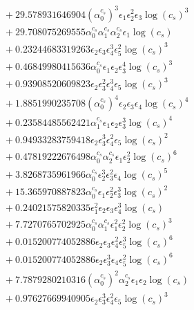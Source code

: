 \documentclass[10pt]{article}
\begin{document}
\begin{align*}
&{}  + 29.578931646904 \left(\alpha_{0}^{c_s}\right)^{3} \epsilon_{1} \epsilon_{2}^{2} \epsilon_{3} \log{\left(c_{s} \right)}^{3} \\
&{}  + 29.708075269555 \alpha_{0}^{c_s} \alpha_{1}^{c_s} \alpha_{2}^{c_s} \epsilon_{1} \log{\left(c_{s} \right)} \\
&{}  + 0.23244683319263 \epsilon_{2} \epsilon_{3} \epsilon_{4}^{3} \epsilon_{5}^{2} \log{\left(c_{s} \right)}^{3} \\
&{}  + 0.46849980415636 \alpha_{0}^{c_s} \epsilon_{1} \epsilon_{2} \epsilon_{3}^{4} \log{\left(c_{s} \right)}^{3} \\
&{}  + 0.93908520609823 \epsilon_{2} \epsilon_{3}^{2} \epsilon_{4}^{3} \epsilon_{5} \log{\left(c_{s} \right)}^{3} \\
&{}  + 1.8851990235708 \left(\alpha_{0}^{c_s}\right)^{4} \epsilon_{2} \epsilon_{3} \epsilon_{4} \log{\left(c_{s} \right)}^{4} \\
&{}  + 0.23584485562421 \alpha_{1}^{c_s} \epsilon_{1} \epsilon_{2} \epsilon_{3}^{3} \log{\left(c_{s} \right)}^{4} \\
&{}  + 0.94933283759418 \epsilon_{2} \epsilon_{3}^{3} \epsilon_{4}^{2} \epsilon_{5} \log{\left(c_{s} \right)}^{2} \\
&{}  + 0.47819222676498 \alpha_{0}^{c_s} \alpha_{2}^{c_s} \epsilon_{1} \epsilon_{2}^{2} \log{\left(c_{s} \right)}^{6} \\
&{}  + 3.8268735961966 \alpha_{0}^{c_s} \epsilon_{2}^{3} \epsilon_{3}^{2} \epsilon_{4} \log{\left(c_{s} \right)}^{5} \\
&{}  + 15.365970887823 \alpha_{0}^{c_s} \epsilon_{1} \epsilon_{2}^{2} \epsilon_{3}^{3} \log{\left(c_{s} \right)}^{2} \\
&{}  + 0.24021575820335 \epsilon_{1}^{2} \epsilon_{2} \epsilon_{3} \epsilon_{4}^{3} \log{\left(c_{s} \right)} \\
&{}  + 7.7270765702925 \alpha_{0}^{c_s} \alpha_{1}^{c_s} \epsilon_{1}^{2} \epsilon_{2}^{2} \log{\left(c_{s} \right)}^{3} \\
&{}  + 0.015200774052886 \epsilon_{2} \epsilon_{3} \epsilon_{4}^{2} \epsilon_{5}^{3} \log{\left(c_{s} \right)}^{6} \\
&{}  + 0.015200774052886 \epsilon_{2} \epsilon_{3}^{3} \epsilon_{4} \epsilon_{5}^{2} \log{\left(c_{s} \right)}^{6} \\
&{}  + 7.7879280210316 \left(\alpha_{0}^{c_s}\right)^{2} \alpha_{2}^{c_s} \epsilon_{1} \epsilon_{2} \log{\left(c_{s} \right)} \\
&{}  + 0.97627669940905 \epsilon_{2} \epsilon_{3}^{3} \epsilon_{4}^{2} \epsilon_{5} \log{\left(c_{s} \right)}^{3} \\

\end{align*}
\end{document}
